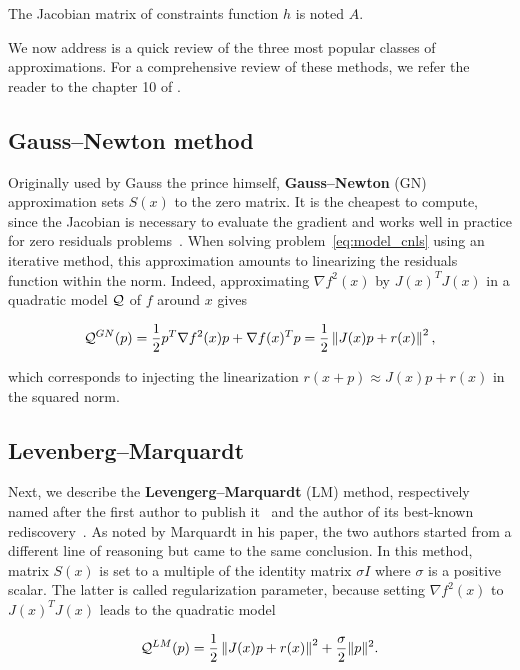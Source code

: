 \documentclass[10pt]{article}
\numberwithin{equation}{section}
\begin{document}
	 The Jacobian matrix of constraints function $h$ is noted $A$.
	 
	 
	 
	 We now address is a quick review of the three most popular classes of approximations. For a comprehensive review of these methods, we refer the reader to the chapter 10 of \cite{dennisschnabel:1996}.
	 
	 \subsection{Gauss--Newton method}
	 
	 Originally used by Gauss the prince himself, \textbf{Gauss--Newton} (GN) approximation sets $S(x)$ to the zero matrix. It is the cheapest to compute, since the Jacobian is necessary to evaluate the gradient and works well in practice for zero residuals problems~\cite{dennisschnabel:1996}. When solving problem~\eqref{eq:model_cnls} using an iterative method, this approximation amounts to linearizing the residuals function within the norm. Indeed, approximating $\nabla f^2(x)$ by $J(x)^TJ(x)$ in a quadratic model ${\mathcal{Q}}$ of $f$ around $x$ gives
	 
	 \begin{equation}\label{eq:gn_model}
	 	{\mathcal{Q}}^{GN} (p) = \dfrac{1}{2}p^T\nabla f^2(x)p + \nabla f(x)^Tp =  \dfrac{1}{2} \left\Vert J(x)p+r(x) \right\Vert^2,
	 \end{equation}
	 
	 which corresponds to injecting the linearization $r(x+p) \approx J(x)p+r(x)$ in the squared norm.
	 
	 \subsection{Levenberg--Marquardt}
	 
	 Next, we describe the \textbf{Levengerg--Marquardt} (LM) method, respectively named after the first author to publish it~\cite{levenberg:1944} and the author of its best-known rediscovery~\cite{marquardt:1963}. As noted by Marquardt in his paper, the two authors started from a different line of reasoning but came to the same conclusion. In this method, matrix $S(x)$ is set to a multiple of the identity matrix $\sigma I$ where $\sigma$ is a positive scalar. The latter is called regularization parameter, because setting  $\nabla f^2(x)$ to $J(x)^TJ(x)$ leads to the quadratic model 
	 
	 \begin{equation}\label{eq:lm_model}
	 	{\mathcal{Q}}^{LM}(p) =  \dfrac{1}{2} \left\Vert J(x)p+r(x) \right\Vert^2 + \dfrac{\sigma}{2} \|p\|^2.
	 \end{equation}
	 
\end{document}
